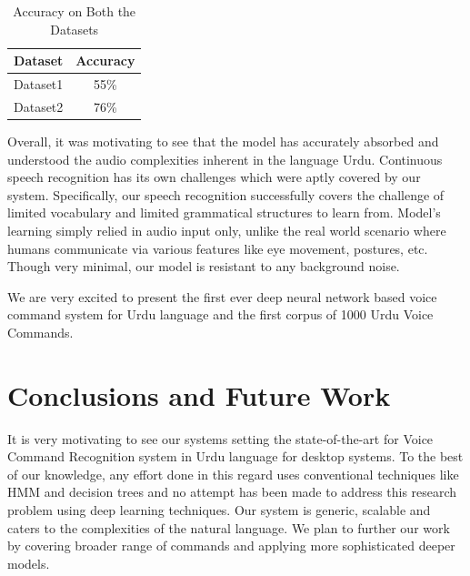 \documentclass[conference]{IEEEtran}
\begin{document}
\begin{table}[h!]
  \begin{center}
    \caption{Accuracy on Both the Datasets}
    \label{table:datasetAccuracy}
    \begin{tabular}{S|S}
      \hline
      \textbf{Dataset} & \textbf{Accuracy}\\
      \hline
      Dataset1 & 55\%\\
      Dataset2 & 76\%\\
			\hline
    \end{tabular}
  \end{center}
\end{table}

Overall, it was motivating to see that the model has accurately absorbed and understood the audio complexities inherent in the language Urdu. Continuous speech recognition has its own challenges which were aptly covered by our system. Specifically, our speech recognition successfully covers the challenge of limited vocabulary and limited grammatical structures to learn from. Model's learning simply relied in audio input only, unlike the real world scenario where humans communicate via various features like eye movement, postures, etc. Though very minimal, our model is resistant to any background noise.
  

We are very excited to present the first ever deep neural network based voice command system for Urdu language and the first corpus of 1000 Urdu Voice Commands. 

\section{Conclusions and Future Work} \label{ConclusionsandFutureWork}
It is very motivating to see our systems setting the state-of-the-art for Voice Command Recognition system in Urdu language for desktop systems. To the best of our knowledge, any effort done in this regard uses conventional techniques like HMM and decision trees and no attempt has been made to address this research problem using deep learning techniques. Our system is generic, scalable and caters to the complexities of the natural language. 
We plan to further our work by covering broader range of commands and applying more sophisticated deeper models. 
\end{document}
